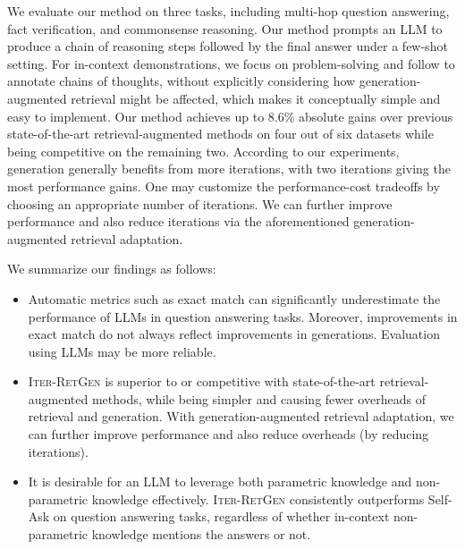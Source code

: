 \documentclass[11pt]{article}
\begin{document}
We evaluate our method on three tasks, including multi-hop question answering, fact verification, and commonsense reasoning.
Our method prompts an LLM to produce a chain of reasoning steps followed by the final answer under a few-shot setting.
For in-context demonstrations, we focus on problem-solving and follow \citet{DBLP:journals/corr/abs-2201-11903} to annotate chains of thoughts, without explicitly considering how generation-augmented retrieval might be affected, which makes it conceptually simple and easy to implement.
Our method achieves up to 8.6\% absolute gains over previous state-of-the-art retrieval-augmented methods on four out of six datasets while being competitive on the remaining two.
According to our experiments, generation generally benefits from more iterations, with two iterations giving the most performance gains.
One may customize the performance-cost tradeoffs by choosing an appropriate number of iterations.
We can further improve performance and also reduce iterations via the aforementioned generation-augmented retrieval adaptation.

We summarize our findings as follows:
\begin{itemize}
    \item Automatic metrics such as exact match can significantly underestimate the performance of LLMs in question answering tasks. Moreover, improvements in exact match do not always reflect improvements in generations. Evaluation using LLMs may be more reliable.
    \item I\textsc{ter}-R\textsc{et}G\textsc{en} is superior to or competitive with state-of-the-art retrieval-augmented methods, while being simpler and causing fewer overheads of retrieval and generation. With generation-augmented retrieval adaptation, we can further improve performance and also reduce overheads (by reducing iterations).
    \item It is desirable for an LLM to leverage both parametric knowledge and non-parametric knowledge effectively. I\textsc{ter}-R\textsc{et}G\textsc{en} consistently outperforms Self-Ask on question answering tasks, regardless of whether in-context non-parametric knowledge mentions the answers or not.
\end{itemize}
\end{document}
